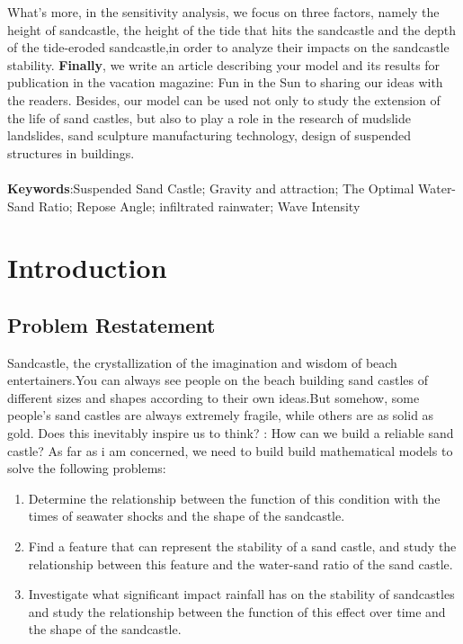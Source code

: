\documentclass[12pt]{article}
\begin{document}
What's more, in the sensitivity analysis, we focus on three factors, namely the height of sandcastle, the height of the tide that hits the sandcastle and the depth of the tide-eroded sandcastle,in order to analyze their impacts on the sandcastle stability. \textbf{Finally}, we write an article describing your model and its results for publication in the vacation magazine: Fun in the Sun to sharing our ideas with the readers. Besides, our model can be used not only to study the extension of the life of sand castles, but also to play a role in the research of mudslide landslides, sand sculpture manufacturing technology, design of suspended structures in buildings.
\\
\\
\textbf{Keywords}:Suspended Sand Castle; Gravity and attraction; The Optimal Water-Sand Ratio; Repose Angle; infiltrated rainwater; Wave Intensity

\clearpage
\pagestyle{fancy}
\tableofcontents 
\newpage
\setcounter{page}{1}
\section{Introduction}
\subsection{Problem Restatement}
Sandcastle, the crystallization of the imagination and wisdom of beach entertainers.You can always see people on the beach building sand castles of different sizes and shapes according to their own ideas.But somehow, some people's sand castles are always extremely fragile, while others are as solid as gold. Does this inevitably inspire us to think? : How can we build a reliable sand castle? As far as i am concerned, we need to build build mathematical models to solve the following problems:
\begin{enumerate}
	\item Determine the relationship between the function of this condition with the times of seawater shocks and the shape of the sandcastle.
	\item Find a feature that can represent the stability of a sand castle, and study the relationship between this feature and the water-sand ratio of the sand castle.
	\item Investigate what significant impact rainfall has on the stability of sandcastles and study the relationship between the function of this effect over time and the shape of the sandcastle.
\end{enumerate}
\end{document}
